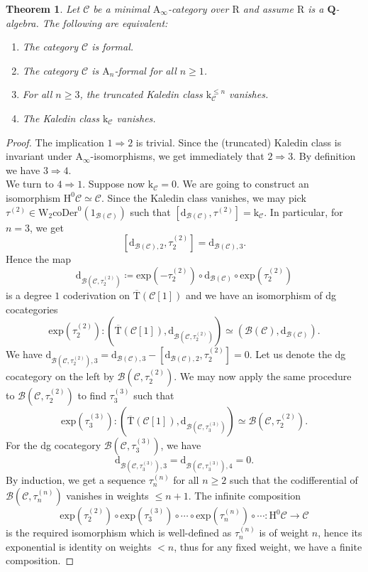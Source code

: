 \documentclass{article}
\theoremstyle{plain}
\newtheorem{theorem}{Theorem}[subsection]   %
\theoremstyle{definition}
\theoremstyle{remark}
\newcommand{\mr}{\mathrm}
\newcommand{\Aa}{\mr{A}_{\infty}}
\newcommand{\Q}{\mathbf Q}
\newcommand{\Cc}{\mathcal C}
\newcommand{\3}{\vspace{3mm}}
\newcommand{\2}{\vspace{2mm}}
\newcommand{\1}{\vspace{1mm}}
\begin{document}
\begin{theorem}\label{kal}
Let $\mathcal{C}$ be a minimal $\Aa$-category over $\mr{R}$ and assume $\mr{R}$ is a $\Q$-algebra. The following are equivalent:
\begin{enumerate}
\item The category $\mathcal{C}$ is formal.
\item The category $\mathcal{C}$ is $\mr{A}_n$-formal for all $n\ge 1$.
\item For all $n\ge 3$, the truncated Kaledin class $\mr{k}^{\le n}_\mathcal{C}$ vanishes.
\item The Kaledin class $\mr{k}_\mathcal{C}$ vanishes.
\end{enumerate}
\end{theorem}

\begin{proof}
The implication $1 \Rightarrow 2$ is trivial. Since the (truncated) Kaledin class is invariant under $\Aa$-isomorphisms, we get immediately that $2 \Rightarrow 3$. By definition we have $3 \Rightarrow 4$.\\
We turn to $4\Rightarrow 1$. Suppose now $\mr{k}_\Cc=0$. We are going to construct an isomorphism $\mr{H}^0\Cc \simeq \Cc$. Since the Kaledin class vanishes, we may pick $\tau^{(2)} \in \mr{W}_2\mr{coDer}^0(1_{\mathcal{B}(\Cc)})$ such that $[\mr{d}_{\mathcal{B}(\Cc)},\tau^{(2)}]=\mr{k}_\Cc$. In particular, for $n=3$, we get $$[\mr{d}_{\mathcal{B}(\Cc),2}, \tau_2^{(2)}]=\mr{d}_{\mathcal{B}(\Cc),3}.$$ Hence the map $$\mr{d}_{\mathcal{B}\left(\Cc,\tau_2^{(2)}\right)}\coloneqq \mr{exp}(-\tau_2^{(2)})\circ \mr{d}_{\mathcal{B}(\Cc)}\circ \mr{exp}(\tau_2^{(2)})$$ is a degree $1$ coderivation on $\overline{\mr T}(\Cc[1])$ and we have an isomorphism of dg cocategories $$\mr{exp}(\tau_2^{(2)}):\left(\overline{\mr{T}}(\Cc[1]),\mr{d}_{\mathcal{B}\left(\Cc,\tau_2^{(2)}\right)}\right)\simeq \left(\mathcal{B}(\Cc),\mr{d}_{\mathcal{B}(\Cc)}\right).$$ We have $\mr{d}_{\mathcal{B}\left(\Cc,\tau_2^{(2)}\right),3}=\mr{d}_{\mathcal{B}(\Cc),3}-[\mr{d}_{\mathcal{B}(\Cc),2},\tau_2^{(2)}]=0$. Let us denote the dg cocategory on the left by $\mathcal{B}\left(\Cc,{\tau_2^{(2)}}\right)$. We may now apply the same procedure to $\mathcal{B}\left(\Cc,{\tau_2^{(2)}}\right)$ to find $\tau_3^{(3)}$ such that $$\mr{exp}(\tau_3^{(3)}):\left(\overline{\mr{T}}(\Cc[1]),\mr{d}_{\mathcal{B}\left(\Cc,\tau_3^{(3)}\right)}\right)\simeq \mathcal{B}\left(\Cc,{\tau_2^{(2)}}\right).$$ For the dg cocategory $\mathcal{B}\left(\Cc,{\tau_3^{(3)}}\right)$, we have $$\mr{d}_{\mathcal{B}\left(\Cc,\tau_3^{(3)}\right),3}=\mr{d}_{\mathcal{B}\left(\Cc,\tau_3^{(3)}\right),4}=0.$$ By induction, we get a sequence $\tau_{n}^{(n)}$ for all $n\ge 2$ such that the codifferential of $\mathcal{B}\left(\Cc,{\tau_n^{(n)}}\right)$ vanishes in weights $\le n+1$. The infinite composition $$\mr{exp}\left(\tau_2^{(2)}\right)\circ \mr{exp}\left(\tau_3^{(3)}\right)\circ \cdots \circ \mr{exp}\left(\tau_n^{(n)}\right)\circ \cdots : \mr{H}^0\Cc \to \Cc$$ is the required isomorphism which is well-defined as $\tau_n^{(n)}$ is of weight $n$, hence its exponential is identity on weights $<n$, thus for any fixed weight, we have a finite composition. 
\end{proof}
\end{document}
